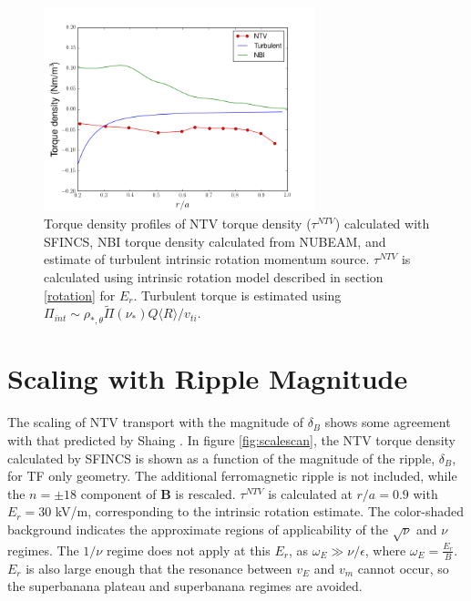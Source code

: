 \documentclass{article}
\begin{document}
\begin{figure}[h!]
\centering
\includegraphics[width=0.7\textwidth]{AllTorquePlot.png}
\caption{Torque density profiles of NTV torque density ($\tau^{NTV}$) calculated with SFINCS, NBI torque density calculated from NUBEAM, and estimate of turbulent intrinsic rotation momentum source. $\tau^{NTV}$ is calculated using intrinsic rotation model described in section \ref{rotation} for $E_r$. Turbulent torque is estimated using $\Pi_{int} \sim \rho_{*, \theta} \widetilde{\Pi}(\nu_*) Q \langle R \rangle/v_{ti}$.}
\end{figure}\label{fig:alltorque}

\FloatBarrier

\section{Scaling with Ripple Magnitude}\label{scaling}
The scaling of NTV transport with the magnitude of $\delta_B$ shows some agreement with that predicted by Shaing \cite{Shaing2008}. In figure \ref{fig:scalescan}, the NTV torque density calculated by SFINCS is shown as a function of the magnitude of the ripple, $\delta_B$, for TF only geometry. The additional ferromagnetic ripple is not included, while the $n= \pm18$ component of $\bm{B}$ is rescaled. $\tau^{NTV}$ is calculated at $r/a = 0.9$ with $E_r = 30$ kV/m, corresponding to the intrinsic rotation estimate. The color-shaded background indicates the approximate regions of applicability of the $\sqrt{\nu}$ and $\nu$ regimes. The $1/\nu$ regime does not apply at this $E_r$, as $\omega_E \gg \nu/\epsilon$, where $\omega_E = \frac{E_r}{B}$. $E_r$ is also large enough that the resonance between $v_{E}$ and $v_{m}$ cannot occur, so the superbanana plateau and superbanana regimes are avoided. 
\end{document}
